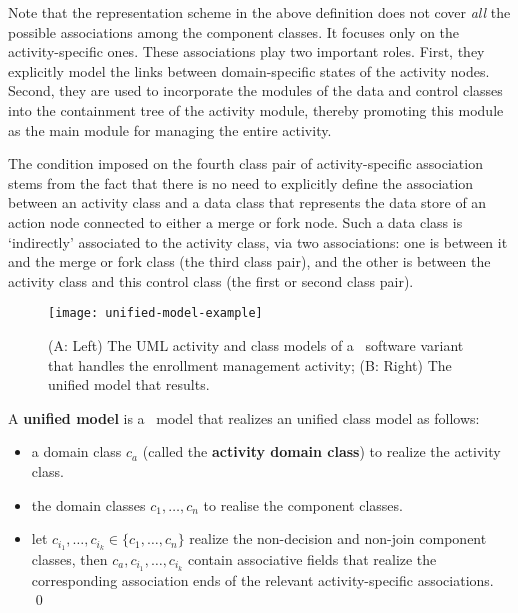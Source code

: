 Note that the representation scheme in the above definition does not cover \textit{all} the possible associations among the component classes. It focuses only on the activity-specific ones. 
%
These associations play two important roles. First, they explicitly model the links between domain-specific states of the activity nodes. Second, they are used to incorporate the modules of the data and control classes into the containment tree of the activity module, thereby promoting this module as the main module for managing the entire activity.

The condition imposed on the fourth class pair of activity-specific association stems from the fact that there is no need to explicitly define the association between an activity class and a data class that represents the data store of an action node connected to either a merge or fork node. Such a data class is `indirectly' associated to the activity class, via two associations: one is between it and the merge or fork class (the third class pair), and the other is between the activity class and this control class (the first or second class pair).

\begin{figure*}[ht]
	\begin{center}
		\texttt{[image: unified-model-example]}
	\end{center}
	\caption{(A: Left) The UML activity and class models of a \courseman~software variant that handles the enrollment management activity; (B: Right) The unified model that results.} %
	\label{fig:unified-model-example}
\end{figure*} 

\begin{definition} \label{def:unified-model}
	A \textbf{unified model} is a \dcsl~model that realizes an unified class model as follows:
	\begin{itemize}%
		\item a domain class $ c_a $ (called the \textbf{activity domain class}) to realize the activity class.
		\item the domain classes $ c_1,\dots,c_n $ to realise the component classes.
		\item let $ c_{i_1},\dots,c_{i_k} \in \{c_1,\dots,c_n\} $ realize the non-decision and non-join component classes, then $ c_a,c_{i_1},\dots,c_{i_k} $ contain associative fields that realize the corresponding association ends of the relevant activity-specific associations. \qed
	\end{itemize}
\end{definition}

